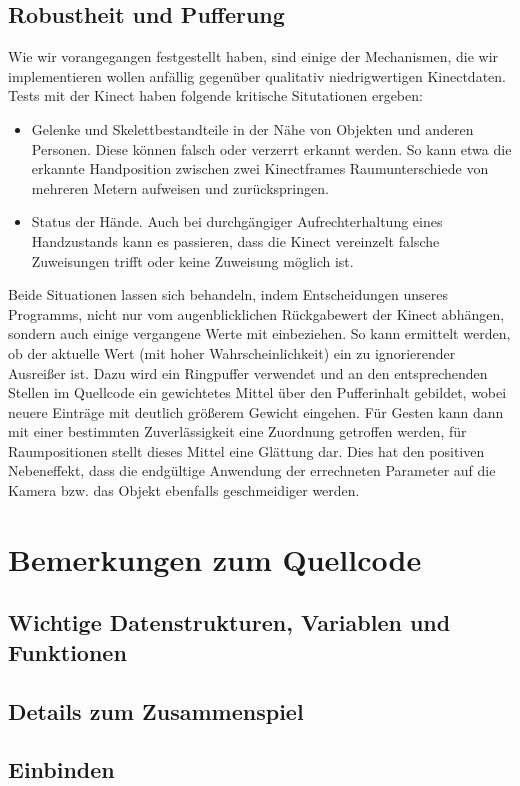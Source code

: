 \documentclass[12pt,a4paper]{article}
\begin{document}
	\subsection{Robustheit und Pufferung}
	Wie wir vorangegangen festgestellt haben, sind einige der Mechanismen, die wir implementieren wollen anfällig gegenüber qualitativ niedrigwertigen Kinectdaten. Tests mit der Kinect haben folgende kritische Situtationen ergeben:
	\begin{itemize}
		\item Gelenke und Skelettbestandteile in der Nähe von Objekten und anderen Personen. Diese können falsch oder verzerrt erkannt werden. So kann etwa die erkannte Handposition zwischen zwei Kinectframes Raumunterschiede von mehreren Metern aufweisen und zurückspringen.
		\item Status der Hände. Auch bei durchgängiger Aufrechterhaltung eines Handzustands kann es passieren, dass die Kinect vereinzelt falsche Zuweisungen trifft oder keine Zuweisung möglich ist.
	\end{itemize}
	Beide Situationen lassen sich behandeln, indem Entscheidungen unseres Programms, nicht nur vom augenblicklichen Rückgabewert der Kinect abhängen, sondern auch einige vergangene Werte mit einbeziehen. So kann ermittelt werden, ob der aktuelle Wert (mit hoher Wahrscheinlichkeit) ein zu ignorierender Ausreißer ist. Dazu wird ein Ringpuffer verwendet und an den entsprechenden Stellen im Quellcode ein gewichtetes Mittel über den Pufferinhalt gebildet, wobei neuere Einträge mit deutlich größerem Gewicht eingehen. Für Gesten kann dann mit einer bestimmten Zuverlässigkeit eine Zuordnung getroffen werden, für Raumpositionen stellt dieses Mittel eine Glättung dar. Dies hat den positiven Nebeneffekt, dass die endgültige Anwendung der errechneten Parameter auf die Kamera bzw. das Objekt ebenfalls geschmeidiger werden.
\section{Bemerkungen zum Quellcode}
	\subsection{Wichtige Datenstrukturen, Variablen und Funktionen}
	\subsection{Details zum Zusammenspiel}
	\subsection{Einbinden}
\end{document}
